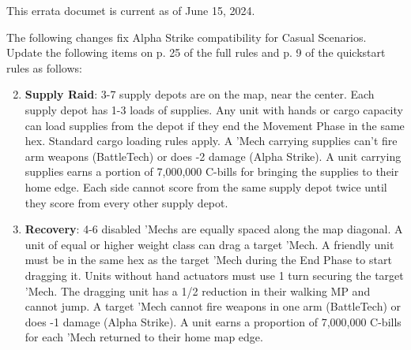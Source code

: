 This errata documet is current as of June 15, 2024.

The following changes fix Alpha Strike compatibility for Casual Scenarios.
Update the following items on p. 25 of the full rules and p. 9 of the quickstart rules  as follows:

\begin{enumerate}

\setcounter{enumi}{1}
\item {\bfseries Supply Raid}: 3-7 supply depots are on the map, near the center.
Each supply depot has 1-3 loads of supplies.
Any unit with hands or cargo capacity can load supplies from the depot if they end the Movement Phase in the same hex.
Standard cargo loading rules apply.
A 'Mech carrying supplies can't fire arm weapons (BattleTech) or does -2 damage (Alpha Strike).
A unit carrying supplies earns a portion of 7,000,000 C-bills for bringing the supplies to their home edge.
Each side cannot score from the same supply depot twice until they score from every other supply depot.

\setcounter{enumi}{7}
\item {\bfseries Recovery}: 4-6 disabled 'Mechs are equally spaced along the map diagonal.
A unit of equal or higher weight class can drag a target 'Mech.
A friendly unit must be in the same hex as the target 'Mech during the End Phase to start dragging it.
Units without hand actuators must use 1 turn securing the target 'Mech.
The dragging unit has a 1/2 reduction in their walking MP and cannot jump.
A target 'Mech cannot fire weapons in one arm (BattleTech) or does -1 damage (Alpha Strike).
A unit earns a proportion of 7,000,000 C-bills for each 'Mech returned to their home map edge.

\end{enumerate}
